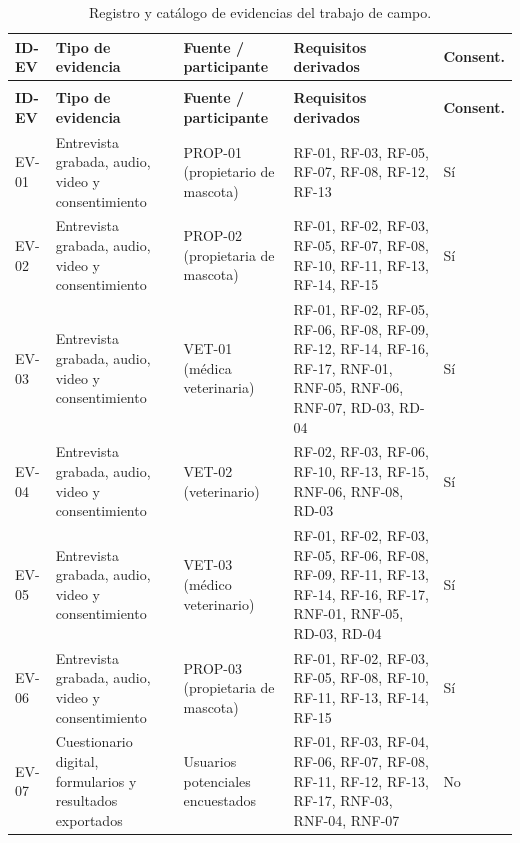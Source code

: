\documentclass[journal,onecolumn]{IEEEtran}
\begin{document}
	{\small
		\begin{longtable}{@{}>{\raggedright\arraybackslash}p{1.2cm} >{\raggedright\arraybackslash}p{3.1cm} >{\raggedright\arraybackslash}p{3.1cm} >{\raggedright\arraybackslash}p{6.0cm} >{\raggedright\arraybackslash}p{1.4cm}@{}}
			\caption{Registro y catálogo de evidencias del trabajo de campo.}
			\label{tab:catalogo-evidencias}\\
			\toprule
			\textbf{ID-EV} & \textbf{Tipo de evidencia} & \textbf{Fuente / participante} & \textbf{Requisitos derivados} & \textbf{Consent.} \\
			\midrule
			\endfirsthead
			\multicolumn{5}{@{}l}{\small\itshape (continuación)}\\
			\toprule
			\textbf{ID-EV} & \textbf{Tipo de evidencia} & \textbf{Fuente / participante} & \textbf{Requisitos derivados} & \textbf{Consent.} \\
			\midrule
			\endhead
			\bottomrule
			\endlastfoot
			EV-01 & Entrevista grabada, audio, video y consentimiento & PROP-01 (propietario de mascota) & RF-01, RF-03, RF-05, RF-07, RF-08, RF-12, RF-13 & Sí \\
			\addlinespace
			EV-02 & Entrevista grabada, audio, video y consentimiento & PROP-02 (propietaria de mascota) & RF-01, RF-02, RF-03, RF-05, RF-07, RF-08, RF-10, RF-11, RF-13, RF-14, RF-15 & Sí \\
			\addlinespace
			EV-03 & Entrevista grabada, audio, video y consentimiento & VET-01 (médica veterinaria) & RF-01, RF-02, RF-05, RF-06, RF-08, RF-09, RF-12, RF-14, RF-16, RF-17, RNF-01, RNF-05, RNF-06, RNF-07, RD-03, RD-04 & Sí \\
			\addlinespace
			EV-04 & Entrevista grabada, audio, video y consentimiento & VET-02 (veterinario) & RF-02, RF-03, RF-06, RF-10, RF-13, RF-15, RNF-06, RNF-08, RD-03 & Sí \\
			\addlinespace
			EV-05 & Entrevista grabada, audio, video y consentimiento & VET-03 (médico veterinario) & RF-01, RF-02, RF-03, RF-05, RF-06, RF-08, RF-09, RF-11, RF-13, RF-14, RF-16, RF-17, RNF-01, RNF-05, RD-03, RD-04 & Sí \\
			\addlinespace
			EV-06 & Entrevista grabada, audio, video y consentimiento & PROP-03 (propietaria de mascota) & RF-01, RF-02, RF-03, RF-05, RF-08, RF-10, RF-11, RF-13, RF-14, RF-15 & Sí \\
			\addlinespace
			EV-07 & Cuestionario digital, formularios y resultados exportados & Usuarios potenciales encuestados & RF-01, RF-03, RF-04, RF-06, RF-07, RF-08, RF-11, RF-12, RF-13, RF-17, RNF-03, RNF-04, RNF-07 & No \\

\end{longtable}}
\end{document}

